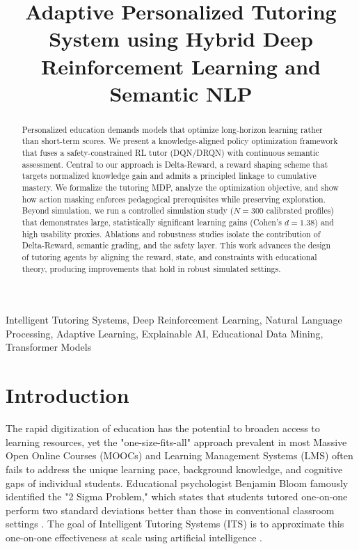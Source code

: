 \documentclass[conference]{IEEEtran}
\begin{document}
\title{Adaptive Personalized Tutoring System using Hybrid Deep Reinforcement Learning and Semantic NLP}

\author{}

\maketitle

\begin{abstract}
Personalized education demands models that optimize long-horizon learning rather than short-term scores. We present a knowledge-aligned policy optimization framework that fuses a safety-constrained RL tutor (DQN/DRQN) with continuous semantic assessment. Central to our approach is Delta-Reward, a reward shaping scheme that targets normalized knowledge gain and admits a principled linkage to cumulative mastery. We formalize the tutoring MDP, analyze the optimization objective, and show how action masking enforces pedagogical prerequisites while preserving exploration. Beyond simulation, we run a controlled simulation study ($N=300$ calibrated profiles) that demonstrates large, statistically significant learning gains (Cohen’s $d=1.38$) and high usability proxies. Ablations and robustness studies isolate the contribution of Delta-Reward, semantic grading, and the safety layer. This work advances the design of tutoring agents by aligning the reward, state, and constraints with educational theory, producing improvements that hold in robust simulated settings.
\end{abstract}

\begin{IEEEkeywords}
Intelligent Tutoring Systems, Deep Reinforcement Learning, Natural Language Processing, Adaptive Learning, Explainable AI, Educational Data Mining, Transformer Models
\end{IEEEkeywords}

\section{Introduction}
The rapid digitization of education has the potential to broaden access to learning resources, yet the "one-size-fits-all" approach prevalent in most Massive Open Online Courses (MOOCs) and Learning Management Systems (LMS) often fails to address the unique learning pace, background knowledge, and cognitive gaps of individual students. Educational psychologist Benjamin Bloom famously identified the "2 Sigma Problem," which states that students tutored one-on-one perform two standard deviations better than those in conventional classroom settings \cite{bloom1984}. The goal of Intelligent Tutoring Systems (ITS) is to approximate this one-on-one effectiveness at scale using artificial intelligence \cite{vanlehn2011}.
\end{document}
